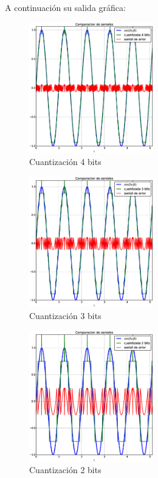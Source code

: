 \documentclass[10pt]{article}
\begin{document}
A continuación su salida gráfica:


\begin{figure}[H]
   \centering
   \includegraphics[width=0.48\textwidth]{./Images/seniales_4_bits.eps}
   \caption{Cuantización 4 bits}\label{fig:q:4}     
\end{figure}


\begin{figure}[H]
   \centering
   \includegraphics[width=0.48\textwidth]{./Images/seniales_3_bits.eps}
   \caption{Cuantización 3 bits}\label{fig:q:3}     
\end{figure}


\begin{figure}[H]
   \centering
   \includegraphics[width=0.48\textwidth]{./Images/seniales_2_bits.eps}
   \caption{Cuantización 2 bits}\label{fig:q:2}     
\end{figure}
\end{document}
